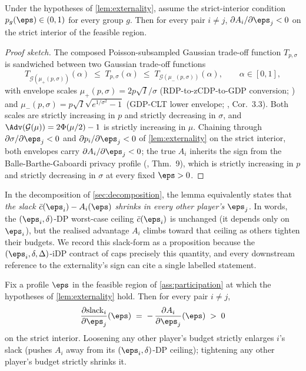 \begin{theorem}
\label{thm:externality-full}
Under the hypotheses of \cref{lem:externality}, assume the strict-interior
condition $p_g(\boldsymbol{\eps}) \in (0,1)$ for every group $g$. Then for
every pair $i \neq j$, $\partial A_i / \partial \eps_j < 0$ on the
strict interior of the feasible region.
\end{theorem}

\begin{proof}[Proof sketch]
The composed Poisson-subsampled Gaussian trade-off function
$T_{p,\sigma}$ is sandwiched between two Gaussian trade-off functions
\[
T_{\mathcal G(\mu_+(p,\sigma))}(\alpha) \;\leq\; T_{p,\sigma}(\alpha)
   \;\leq\; T_{\mathcal G(\mu_-(p,\sigma))}(\alpha),
\qquad \alpha \in [0,1],
\]
with envelope scales
$\mu_+(p,\sigma) = 2p\sqrt{I}/\sigma$
(RDP-to-zCDP-to-GDP conversion; \cite{mironov2017renyi,bun2016concentrated})
and
$\mu_-(p,\sigma) = p\sqrt{I}\sqrt{e^{1/\sigma^2}-1}$
(GDP-CLT lower envelope; \cite{dong2022gaussian}, Cor.~3.3).
Both scales are strictly increasing in $p$ and strictly decreasing in
$\sigma$, and $\Adv(\mathcal G(\mu)) = 2\Phi(\mu/2)-1$ is strictly
increasing in $\mu$. Chaining through
$\partial\sigma/\partial\eps_j < 0$ and $\partial p_i/\partial\eps_j<0$
of \cref{lem:externality} on the strict interior, both envelopes carry
$\partial A_i / \partial \eps_j < 0$; the true $A_i$ inherits the sign
from the Balle-Barthe-Gaboardi privacy profile
(\cite{balle2020privacy}, Thm.~9), which is strictly increasing in
$p$ and strictly decreasing in $\sigma$ at every fixed $\eps > 0$.
\end{proof}

In the decomposition of \cref{sec:decomposition}, the lemma equivalently
states that \emph{the slack $\bar c(\eps_i) - A_i(\boldsymbol{\eps})$
shrinks in every other player's $\eps_j$}. In words, the
$(\eps_i,\delta)$-DP worst-case ceiling $\bar c(\eps_i)$ is unchanged
(it depends only on $\eps_i$), but the realised advantage $A_i$ climbs
toward that ceiling as others tighten their budgets. We record this
slack-form as a proposition because the $(\eps_i, \delta, \Delta)$-iDP
contract of \citet{kaiser2026your, kaissis2024beyond} caps precisely this
quantity, and every downstream reference to the externality's sign can
cite a single labelled statement.

\begin{proposition}
\label{prop:slack-monotonicity}
Fix a profile $\boldsymbol{\eps}$ in the feasible region of
\cref{ass:participation} at which the hypotheses of \cref{lem:externality}
hold. Then for every pair $i \neq j$,
\[
\frac{\partial \mathrm{slack}_i}{\partial \eps_j}(\boldsymbol{\eps})
\;=\; -\,\frac{\partial A_i}{\partial \eps_j}(\boldsymbol{\eps})
\;>\; 0
\]
on the strict interior. Loosening any other player's budget strictly
enlarges $i$'s slack (pushes $A_i$ away from its $(\eps_i,\delta)$-DP
ceiling); tightening any other player's budget strictly shrinks it.
\end{proposition}

